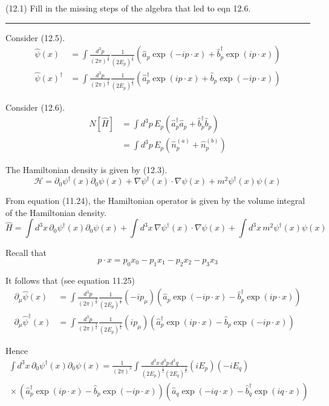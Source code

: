 \documentclass[12pt]{article}
\begin{document}
(12.1)
Fill in the missing steps of the algebra that led to
eqn 12.6.

\bigskip
\hrule

\bigskip
Consider (12.5).
\begin{equation*}
\begin{aligned}
\hat\psi(x)&=\int\frac{d^3p}{(2\pi)^\frac{3}{2}}\frac{1}{(2E_p)^\frac{1}{2}}
\left(\hat a_p\exp(-ip\cdot x)+\hat b_p^\dag\exp(ip\cdot x)\right)
\\
\hat\psi(x)^\dag&=\int\frac{d^3p}{(2\pi)^\frac{3}{2}}\frac{1}{(2E_p)^\frac{1}{2}}
\left(\hat a_p^\dag\exp(ip\cdot x)+\hat b_p\exp(-ip\cdot x)\right)
\end{aligned}
\tag{12.5}
\end{equation*}

Consider (12.6).
\begin{align*}
N[\hat H]&=\int d^3p\,E_p\left(\hat a_p^\dag\hat a_p+\hat b_p^\dag\hat b_p\right)
\\
&=\int d^3p\,E_p\left(\hat n_p^{(a)}+\hat n_p^{(b)}\right)
\tag{12.6}
\end{align*}

The Hamiltonian density is given by (12.3).
\begin{equation*}
\mathcal H=\partial_0\psi^\dag(x)\partial_0\psi(x)+\nabla\psi^\dag(x)\cdot\nabla\psi(x)+m^2\psi^\dag(x)\psi(x)
\tag{12.3}
\end{equation*}

From equation (11.24), the Hamiltonian operator is given by the volume integral of the Hamiltonian density.
\begin{equation*}
\hat H
=\int d^3x\,\partial_0\psi^\dag(x)\partial_0\psi(x)
+\int d^3x\,\nabla\psi^\dag(x)\cdot\nabla\psi(x)
+\int d^3x\,m^2\psi^\dag(x)\psi(x)
\tag{1}
\end{equation*}

Recall that
\begin{equation*}
p\cdot x=p_0x_0-p_1x_1-p_2x_2-p_3x_3
\end{equation*}

It follows that (see equation 11.25)
\begin{equation*}
\begin{aligned}
\partial_\mu\hat\psi(x)
&=\int\frac{d^3p}{(2\pi)^\frac{3}{2}}\frac{1}{(2E_p)^\frac{1}{2}}(-ip_\mu)
\left(\hat a_p\exp(-ip\cdot x)-\hat b_p^\dag\exp(ip\cdot x)\right)
\\
\partial_\mu\hat\psi^\dag(x)
&=\int\frac{d^3p}{(2\pi)^\frac{3}{2}}\frac{1}{(2E_p)^\frac{1}{2}}(ip_\mu)
\left(\hat a_p^\dag\exp(ip\cdot x)-\hat b_p\exp(-ip\cdot x)\right)
\end{aligned}
\end{equation*}

Hence
\begin{multline*}
\int d^3x\,\partial_0\psi^\dag(x)\partial_0\psi(x)
=\frac{1}{(2\pi)^3}\int\frac{d^3x\,d^3p\,d^3q}{(2E_p)^\frac{1}{2}(2E_q)^\frac{1}{2}}
(iE_p)(-iE_q)
\\
{}\times
\left(\hat a_p^\dag\exp(ip\cdot x)-\hat b_p\exp(-ip\cdot x)\right)
\left(\hat a_q\exp(-iq\cdot x)-\hat b_q^\dag\exp(iq\cdot x)\right)
\end{multline*}
\end{document}
